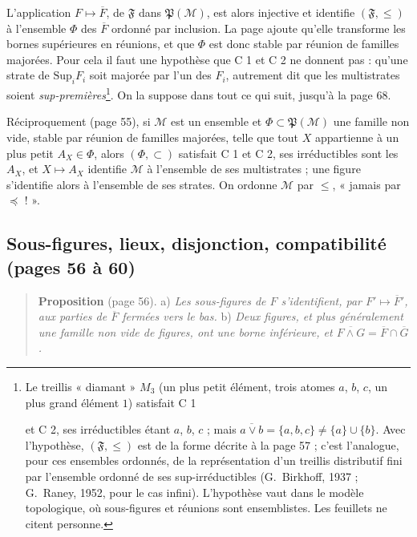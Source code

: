 \documentclass[11pt,a4paper]{article}
\begin{document}
L'application $F \mapsto \overline{F}$, de $\mathfrak{F}$ dans
$\mathfrak{P}(\mathcal{M})$, est alors injective et identifie $(\mathfrak{F},
\leq)$ à l'ensemble $\Phi$ des $\overline{F}$ ordonné par inclusion. La page
ajoute qu'elle transforme les bornes supérieures en réunions, et que $\Phi$ est
donc stable par réunion de familles majorées. Pour cela il faut une hypothèse
que C 1 et C 2 ne donnent pas : qu'une strate de $\mathrm{Sup}_{i} F_{i}$ soit
majorée par l'un des $F_{i}$, autrement dit que les multistrates soient
\emph{sup-premières}\footnote{Le treillis « diamant » $M_{3}$ (un plus petit
élément, trois atomes $a$, $b$, $c$, un plus grand élément $1$) satisfait C 1

et C 2, ses irréductibles étant $a$, $b$, $c$ ; mais $\overline{a \vee b} =
\{a, b, c\} \neq \{a\} \cup \{b\}$. Avec l'hypothèse, $(\mathfrak{F}, \leq)$ est
de la forme décrite à la page 57 ; c'est l'analogue, pour ces ensembles
ordonnés, de la représentation d'un treillis distributif fini par l'ensemble
ordonné de ses sup-irréductibles (G.~Birkhoff, 1937 ; G.~Raney, 1952, pour le
cas infini). L'hypothèse vaut dans le modèle topologique, où sous-figures et
réunions sont ensemblistes. Les feuillets ne citent personne.}. On la suppose
dans tout ce qui suit, jusqu'à la page 68.

Réciproquement (page 55), si $\mathcal{M}$ est un ensemble et $\Phi \subset
\mathfrak{P}(\mathcal{M})$ une famille non vide, stable par réunion de familles
majorées, telle que tout $X$ appartienne à un plus petit $A_{X} \in \Phi$, alors
$(\Phi, \subset)$ satisfait C 1 et C 2, ses irréductibles sont les $A_{X}$, et
$X \mapsto A_{X}$ identifie $\mathcal{M}$ à l'ensemble de ses multistrates ; une
figure s'identifie alors à l'ensemble de ses strates. On ordonne
$\mathcal{M}$ par $\leq$, « jamais par $\preccurlyeq$ ! ».

\subsection*{Sous-figures, lieux, disjonction, compatibilité (pages 56 à 60)}

\begin{quote}
\textbf{Proposition} (page 56). a) \emph{Les sous-figures de $F$
s'identifient, par $F' \mapsto \overline{F}'$, aux parties de $\overline{F}$
fermées vers le bas.} b) \emph{Deux figures, et plus généralement une famille
non vide de figures, ont une borne inférieure, et $\overline{F \wedge G} =
\overline{F} \cap \overline{G}$.}
\end{quote}
\end{document}
